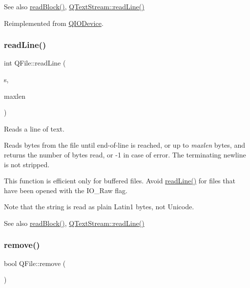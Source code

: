 \begin{DoxySeeAlso}{See also}
\mbox{\hyperlink{class_q_file_ab9a42e65a2fcd51bae5f2a186ff5bee5}{read\+Block()}}, \mbox{\hyperlink{class_q_text_stream_a0bed0242d7c3f17289df88fdecad6afa}{Q\+Text\+Stream\+::read\+Line()}} 
\end{DoxySeeAlso}


Reimplemented from \mbox{\hyperlink{class_q_i_o_device_a4dc865ffcb5b7896ff8f9a1d828e4c0e}{Q\+I\+O\+Device}}.

\mbox{\label{class_q_file_a324c017d391658a8eacf5b35932f5f87}} 
\subsubsection{\texorpdfstring{readLine()}{readLine()}\hspace{0.1cm}{\footnotesize\ttfamily [2/2]}}
{\footnotesize\ttfamily int Q\+File\+::read\+Line (\begin{DoxyParamCaption}\item[{\mbox{\hyperlink{class_q_string}{Q\+String}} \&}]{s,  }\item[{uint}]{maxlen }\end{DoxyParamCaption})}

Reads a line of text.

Reads bytes from the file until end-\/of-\/line is reached, or up to {\itshape maxlen} bytes, and returns the number of bytes read, or -\/1 in case of error. The terminating newline is not stripped.

This function is efficient only for buffered files. Avoid \mbox{\hyperlink{class_q_file_af95c756ce6ff9f597ff1d21c8384d777}{read\+Line()}} for files that have been opened with the {\ttfamily I\+O\+\_\+\+Raw} flag.

Note that the string is read as plain Latin1 bytes, not Unicode.

\begin{DoxySeeAlso}{See also}
\mbox{\hyperlink{class_q_file_ab9a42e65a2fcd51bae5f2a186ff5bee5}{read\+Block()}}, \mbox{\hyperlink{class_q_text_stream_a0bed0242d7c3f17289df88fdecad6afa}{Q\+Text\+Stream\+::read\+Line()}} 
\end{DoxySeeAlso}
\mbox{\label{class_q_file_a57d95ea99c22b455ef0fa232299eba11}} 
\subsubsection{\texorpdfstring{remove()}{remove()}\hspace{0.1cm}{\footnotesize\ttfamily [1/2]}}
{\footnotesize\ttfamily bool Q\+File\+::remove (\begin{DoxyParamCaption}{ }\end{DoxyParamCaption})}

